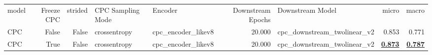 \begin{adjustbox}{width=\textwidth}
\begin{tabular}{lrrllrlrr}
{model} & {Freeze CPC} & {strided} & {CPC Sampling Mode} & {Encoder} & {Downstream Epochs} & {Downstream Model} & {micro} & {macro} \\
CPC & False & False & crossentropy & cpc\_encoder\_likev8 & 20.000 & cpc\_downstream\_twolinear\_v2 & 0.853 & 0.771 \\
CPC & True & False & crossentropy & cpc\_encoder\_likev8 & 20.000 & cpc\_downstream\_twolinear\_v2 & \bfseries \underline{0.873} & \bfseries \underline{0.787} \\
\end{tabular}
\end{adjustbox}